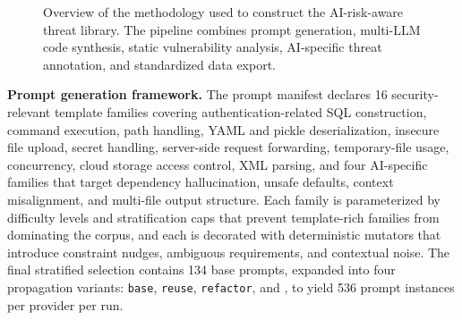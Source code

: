 \documentclass[sigconf,review,anonymous=false]{acmart}
\begin{document}
\begin{figure}[t]
\centering


\caption{Overview of the methodology used to construct the AI-risk-aware threat library. The pipeline combines prompt generation, multi-LLM code synthesis, static vulnerability analysis, AI-specific threat annotation, and standardized data export.}
\label{fig:ai-pipeline}
\end{figure}

\textbf{Prompt generation framework.} The prompt manifest declares
16 security-relevant template families covering
authentication-related SQL construction, command execution, path
handling, YAML and pickle deserialization, insecure file upload,
secret handling, server-side request forwarding, temporary-file usage,
concurrency, cloud storage access control, XML parsing, and four
AI-specific families that target dependency hallucination, unsafe
defaults, context misalignment, and multi-file output structure. Each
family is parameterized by difficulty levels and stratification caps
that prevent template-rich families from dominating the corpus, and
each is decorated with deterministic mutators that introduce
constraint nudges, ambiguous requirements, and contextual noise. The
final stratified selection contains 134 base prompts, expanded into
four propagation variants: \texttt{base}, \texttt{reuse},
\texttt{refactor}, and , to yield 536 prompt
instances per provider per run. 
\end{document}
